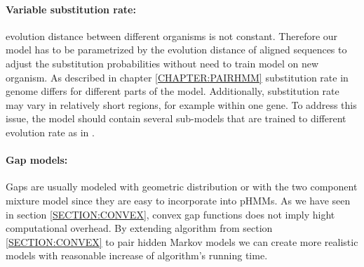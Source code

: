 
\paragraph{Variable substitution rate:} evolution distance between different
organisms is not constant.  Therefore our model has to be parametrized by the
evolution distance of aligned sequences to adjust the substitution probabilities
without need to train model on new organism. As described in chapter
\ref{CHAPTER:PAIRHMM} substitution rate in genome differs for different parts of
the model.  Additionally, substitution rate may vary in relatively short
regions, for example within one gene.  To address this issue, the model should
contain several sub-models that are trained to different evolution rate as in
\cite{Hudek2010}.

\paragraph{Gap models:} Gaps are usually modeled with geometric distribution
or with the two component mixture model since they are easy to incorporate into 
pHMMs. As we have seen in section \ref{SECTION:CONVEX}, convex gap functions
does not imply hight computational overhead. By extending algorithm from section
\ref{SECTION:CONVEX} to pair hidden Markov models we can create more realistic
models with reasonable increase of algorithm's running time.


\label{LastPage}


